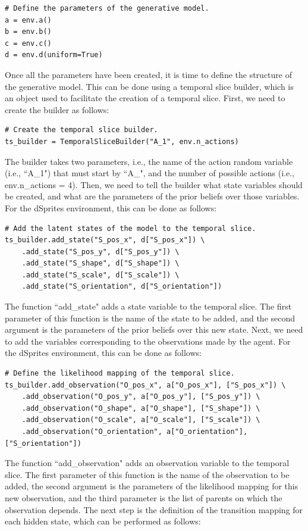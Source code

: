 \documentclass[twoside,11pt]{article}
\begin{document}
\begin{verbatim}
# Define the parameters of the generative model.
a = env.a()
b = env.b()
c = env.c()
d = env.d(uniform=True)
\end{verbatim}
Once all the parameters have been created, it is time to define the structure of the generative model. This can be done using a temporal slice builder, which is an object used to facilitate the creation of a temporal slice. First, we need to create the builder as follows:
\begin{verbatim}
# Create the temporal slice builder.
ts_builder = TemporalSliceBuilder("A_1", env.n_actions)
\end{verbatim}
The builder takes two parameters, i.e., the name of the action random variable (i.e., ``A\_1") that must start by ``A\_", and the number of possible actions (i.e., env.n\_actions = 4). Then, we need to tell the builder what state variables should be created, and what are the parameters of the prior beliefs over those variables. For the dSprites environment, this can be done as follows:
\begin{verbatim}
# Add the latent states of the model to the temporal slice.
ts_builder.add_state("S_pos_x", d["S_pos_x"]) \
    .add_state("S_pos_y", d["S_pos_y"]) \
    .add_state("S_shape", d["S_shape"]) \
    .add_state("S_scale", d["S_scale"]) \
    .add_state("S_orientation", d["S_orientation"])
\end{verbatim}
The function ``add\_state" adds a state variable to the temporal slice. The first parameter of this function is the name of the state to be added, and the second argument is the parameters of the prior beliefs over this new state. Next, we need to add the variables corresponding to the observations made by the agent. For the dSprites environment, this can be done as follows:
\begin{verbatim}
# Define the likelihood mapping of the temporal slice.
ts_builder.add_observation("O_pos_x", a["O_pos_x"], ["S_pos_x"]) \
    .add_observation("O_pos_y", a["O_pos_y"], ["S_pos_y"]) \
    .add_observation("O_shape", a["O_shape"], ["S_shape"]) \
    .add_observation("O_scale", a["O_scale"], ["S_scale"]) \
    .add_observation("O_orientation", a["O_orientation"], ["S_orientation"])
\end{verbatim}
The function ``add\_observation" adds an observation variable to the temporal slice. The first parameter of this function is the name of the observation to be added, the second argument is the parameters of the likelihood mapping for this new observation, and the third parameter is the list of parents on which the observation depends. The next step is the definition of the transition mapping for each hidden state, which can be performed as follows:
\end{document}
